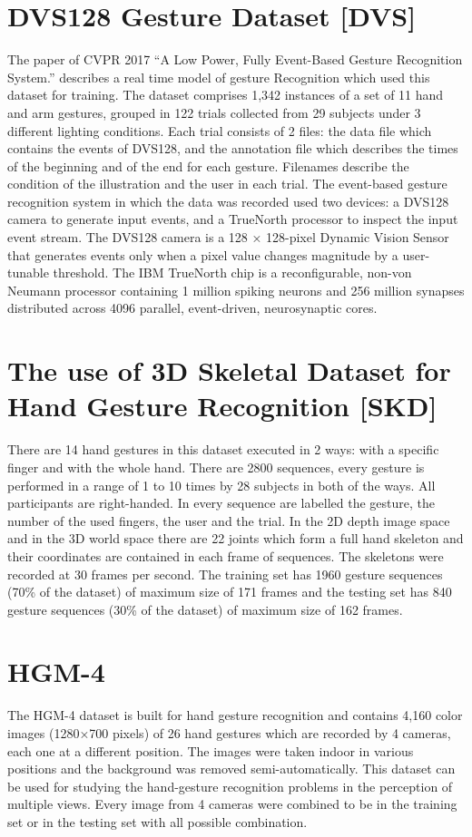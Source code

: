 \documentclass[12pt]{book}
\begin{document}
\section{DVS128 Gesture Dataset [DVS]}
The paper of CVPR 2017 “A Low Power, Fully Event-Based Gesture Recognition System.” describes a real time model of gesture Recognition which used this dataset for training. The dataset comprises 1,342 instances of a set of 11 hand and arm gestures, grouped in 122 trials collected from 29 subjects under 3 different lighting conditions. Each trial consists of 2 files: the data file which contains the events of DVS128, and the annotation file  which describes the times of the beginning and of the end for each gesture. Filenames describe the condition of the illustration and the user in each trial. The event-based gesture recognition system in which the data was recorded used two devices: a DVS128 camera to generate input events, and a TrueNorth processor to inspect the input event stream. The DVS128 camera is a 128 × 128-pixel Dynamic Vision Sensor that generates events only when a pixel value changes magnitude by a user-tunable threshold. The IBM TrueNorth chip is a reconfigurable, non-von Neumann processor containing 1 million spiking neurons and 256 million synapses distributed across 4096 parallel, event-driven, neurosynaptic cores.

\section{The use of 3D Skeletal Dataset for Hand Gesture Recognition [SKD]}
There are 14 hand gestures in this dataset executed in 2 ways: with a specific finger and with the whole hand. There are 2800 sequences, every gesture is performed in a range of 1 to 10 times by 28 subjects in both of the ways. All participants are right-handed. In every sequence are labelled the gesture, the number of the used fingers, the user and the trial. In the 2D depth image space and in the 3D world space there are 22 joints which form a full hand skeleton and their coordinates are contained in each frame of sequences. The skeletons were recorded at 30 frames per second. The training set has 1960 gesture sequences (70\% of the dataset) of maximum size of 171 frames and the testing set has 840 gesture sequences (30\% of the dataset) of maximum size of 162 frames. 

\section{HGM-4}
The HGM-4 dataset \cite{GM4} is built for hand gesture recognition and contains 4,160 color images (1280×700 pixels) of 26 hand gestures which are recorded by 4 cameras, each one at a different position. The images were taken indoor in various positions and the background was removed semi-automatically. This dataset can be used for studying the hand-gesture recognition problems in the perception of multiple views. Every image from 4 cameras were combined to be in the training set or in the testing set with all possible combination.
\end{document}
